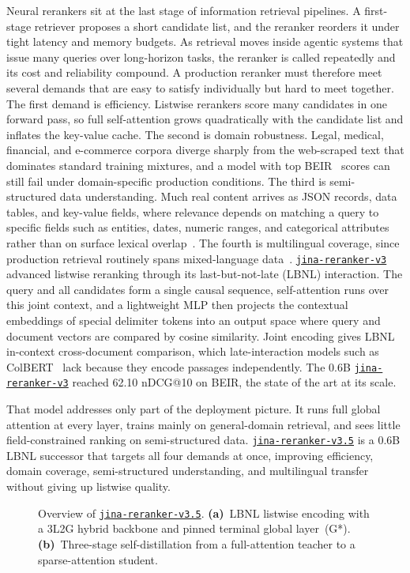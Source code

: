 \documentclass{article}
\newcommand{\jrrvthree}{\href{https://huggingface.co/jinaai/jina-reranker-v3}{\texttt{jina-reranker-v3}}}
\newcommand{\jrrvthreefive}{\href{https://huggingface.co/jinaai/jina-reranker-v3.5}{\texttt{jina-reranker-v3.5}}}
\begin{document}
Neural rerankers sit at the last stage of information retrieval pipelines. A first-stage retriever proposes a short candidate list, and the reranker reorders it under tight latency and memory budgets. As retrieval moves inside agentic systems that issue many queries over long-horizon tasks, the reranker is called repeatedly and its cost and reliability compound. A production reranker must therefore meet several demands that are easy to satisfy individually but hard to meet together.
The first demand is efficiency. Listwise rerankers score many candidates in one forward pass, so full self-attention grows quadratically with the candidate list and inflates the key-value cache. The second is domain robustness. Legal, medical, financial, and e-commerce corpora diverge sharply from the web-scraped text that dominates standard training mixtures, and a model with top BEIR~\citep{thakur2021beir} scores can still fail under domain-specific production conditions. The third is semi-structured data understanding. Much real content arrives as JSON records, data tables, and key-value fields, where relevance depends on matching a query to specific fields such as entities, dates, numeric ranges, and categorical attributes rather than on surface lexical overlap~\citep{stark,ssrb}. The fourth is multilingual coverage, since production retrieval routinely spans mixed-language data~\citep{zhang2022miracl}.
\jrrvthree{}~\citep{wang2025jinarerankerv3} advanced listwise reranking through its last-but-not-late (LBNL) interaction. The query and all candidates form a single causal sequence, self-attention runs over this joint context, and a lightweight MLP then projects the contextual embeddings of special delimiter tokens into an output space where query and document vectors are compared by cosine similarity. Joint encoding gives LBNL in-context cross-document comparison, which late-interaction models such as ColBERT~\cite{khattab2020colbert} lack because they encode passages independently. The 0.6B \jrrvthree{} reached 62.10 nDCG@10 on BEIR, the state of the art at its scale.

That model addresses only part of the deployment picture. It runs full global attention at every layer, trains mainly on general-domain retrieval, and sees little field-constrained ranking on semi-structured data. \jrrvthreefive{} is a 0.6B LBNL successor that targets all four demands at once, improving efficiency, domain coverage, semi-structured understanding, and multilingual transfer without giving up listwise quality.

\begin{figure}[H]
  \centering
  \vspace{-4mm}
  \setlength{\abovecaptionskip}{4pt}%
  \setlength{\belowcaptionskip}{0pt}%
  \resizebox{0.95\textwidth}{!}{}%
  \vspace{-3mm}
  \caption{Overview of \jrrvthreefive{}.
  \textbf{(a)}~LBNL listwise encoding with a 3L2G hybrid backbone and pinned terminal global layer~(G*).
  \textbf{(b)}~Three-stage self-distillation from a full-attention teacher to a sparse-attention student.}
  \label{fig:overview}
\end{figure}
\end{document}
